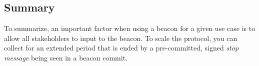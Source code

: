 \subsection{Summary}
To summarize, an important factor when using a beacon for a given use case is to allow all stakeholders to input to the beacon.
To scale the protocol, you can collect for an extended period that is ended by a pre-committed, signed \textit{stop message} being seen in a beacon commit.